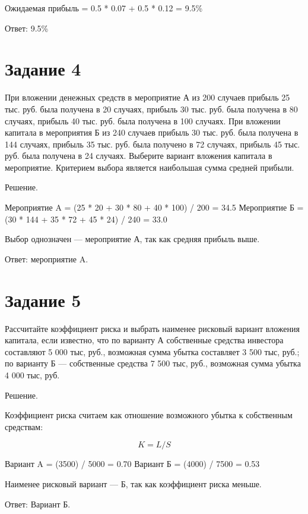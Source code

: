 \documentclass[14pt,a4paper]{extarticle}
\begin{document}
Ожидаемая прибыль = 0.5 * 0.07 + 0.5 * 0.12 = 9.5\%

Ответ: 9.5\%


\section{Задание 4}
\begin{sloppypar}
    При вложении денежных средств в мероприятие А из 200 случаев прибыль 25
    тыс. руб. была получена в 20 случаях, прибыль 30 тыс. руб. была получена в 80 случаях,
    прибыль 40 тыс. руб. была получена в 100 случаях. При вложении капитала в
    мероприятия Б из 240 случаев прибыль 30 тыс. руб. была получена в 144 случаях,
    прибыль 35 тыс. руб. была получено в 72 случаях, прибыль 45 тыс. руб. была получена в
    24 случаях. Выберите вариант вложения капитала в мероприятие. Критерием выбора
    является наибольшая сумма средней прибыли.
\end{sloppypar}

Решение.

Мероприятие A = (25 * 20 + 30 * 80 + 40 * 100) / 200 = 34.5
Мероприятие Б = (30 * 144 + 35 * 72 + 45 * 24) / 240 = 33.0

Выбор однозначен — мероприятие А, так как средняя прибыль выше.

Ответ: мероприятие A.


\section{Задание 5}
\begin{sloppypar}
    Рассчитайте коэффициент риска и выбрать наименее рисковый вариант вложения
    капитала, если известно, что по варианту А собственные средства инвестора составляют
    5 000 тыс, руб., возможная сумма убытка составляет 3 500 тыс, руб.; по варианту Б —
    собственные средства 7 500 тыс, руб., возможная сумма убытка 4 000 тыс, руб.
\end{sloppypar}

Решение.

Коэффициент риска считаем как отношение возможного убытка к собственным средствам:

\[
K = L / S
\]

Вариант A = (3500) / 5000 = 0.70
Вариант Б = (4000) / 7500 = 0.53

Наименее рисковый вариант — Б, так как коэффициент риска меньше.

Ответ: Вариант Б.
\end{document}
